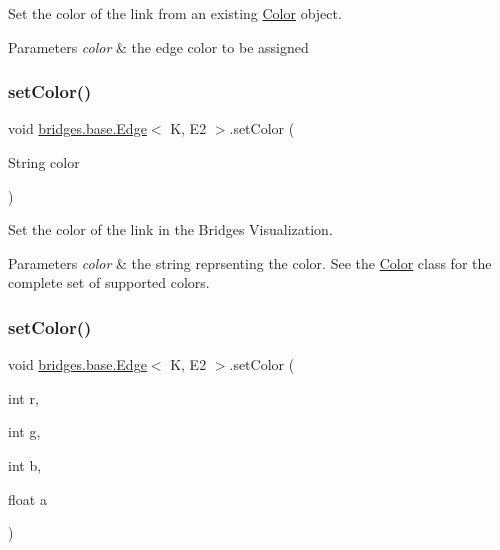 Set the color of the link from an existing \hyperlink{classbridges_1_1base_1_1_color}{Color} object. 


\begin{DoxyParams}{Parameters}
{\em color} & the edge color to be assigned \\
\hline
\end{DoxyParams}
\mbox{\label{classbridges_1_1base_1_1_edge_adc2dbd9f8d74f8749ba64515ca052909}} 
\subsubsection{\texorpdfstring{set\+Color()}{setColor()}\hspace{0.1cm}{\footnotesize\ttfamily [2/3]}}
{\footnotesize\ttfamily void \hyperlink{classbridges_1_1base_1_1_edge}{bridges.\+base.\+Edge}$<$ K, E2 $>$.set\+Color (\begin{DoxyParamCaption}\item[{String}]{color }\end{DoxyParamCaption})}



Set the color of the link in the Bridges Visualization. 


\begin{DoxyParams}{Parameters}
{\em color} & the string reprsenting the color. See the \hyperlink{classbridges_1_1base_1_1_color}{Color} class for the complete set of supported colors. \\
\hline
\end{DoxyParams}
\mbox{\label{classbridges_1_1base_1_1_edge_a4ecf6bdaf140202b41c8a929fbdcdc0c}} 
\subsubsection{\texorpdfstring{set\+Color()}{setColor()}\hspace{0.1cm}{\footnotesize\ttfamily [3/3]}}
{\footnotesize\ttfamily void \hyperlink{classbridges_1_1base_1_1_edge}{bridges.\+base.\+Edge}$<$ K, E2 $>$.set\+Color (\begin{DoxyParamCaption}\item[{int}]{r,  }\item[{int}]{g,  }\item[{int}]{b,  }\item[{float}]{a }\end{DoxyParamCaption})}




